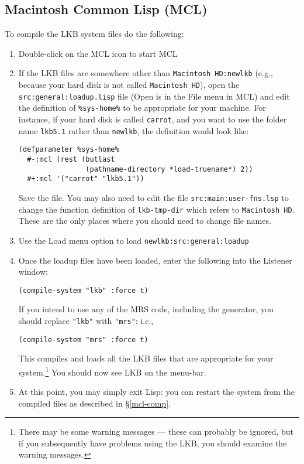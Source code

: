 \documentclass[12pt]{report}
\newcommand{\filename}[1]{{\tt #1}}
\newcommand{\functionname}[1]{{\tt #1}}
\begin{document}
\subsection{Macintosh Common Lisp (MCL)}
\label{mcl-src}

To compile the LKB system files do the following:
\begin{enumerate}
\item Double-click on the MCL icon to start MCL
\item If the LKB files are somewhere other than \filename{Macintosh HD:newlkb}
(e.g., because your hard disk is not called
\filename{Macintosh HD}),
open the \filename{src:general:loadup.lisp} file (Open is in the File menu 
in MCL) and edit the definition of \verb+%sys-home%+ to be appropriate
for your machine.  For instance, if your hard disk is called \filename{carrot},
and you want to use the folder name \filename{lkb5.1}
rather than \filename{newlkb},
the definition would look like:
\begin{verbatim}
(defparameter %sys-home%
  #-:mcl (rest (butlast 
                (pathname-directory *load-truename*) 2))
  #+:mcl '("carrot" "lkb5.1"))
\end{verbatim}
Save the file.
You may also need to edit the file \filename{src:main:user-fns.lsp} to
change the function definition of \functionname{lkb-tmp-dir} which refers to
\filename{Macintosh HD}.  These are the only places where you should need to
change file names.
\item Use the Load menu option to load \filename{newlkb:src:general:loadup}
\item Once the loadup files have been loaded, enter the following into the
Listener window:
\begin{verbatim}
(compile-system "lkb" :force t)
\end{verbatim}
If you intend to use any of the MRS code, including the generator,
you should replace \verb+"lkb"+ with \verb+"mrs"+: i.e.,
\begin{verbatim}
(compile-system "mrs" :force t)
\end{verbatim}
This compiles and loads all the LKB files that are appropriate for
your system.\footnote{There may be
some warning messages --- these can probably be ignored, but if you subsequently
have problems using the LKB, you should examine the
warning messages.}
You
should now see LKB on the menu-bar.
\item
At this point, you may simply exit Lisp:
you can restart the system from the compiled files
as described in \S\ref{mcl-comp}.
\end{enumerate}
\end{document}
